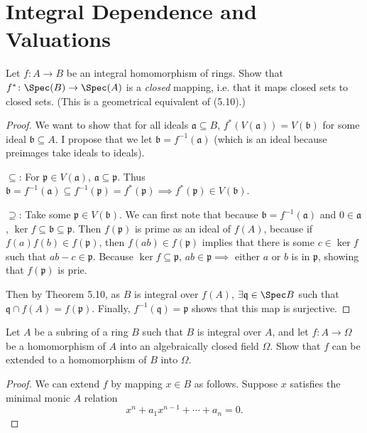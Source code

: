 \section{Integral Dependence and Valuations}

\begin{exercise}
	Let $f \colon A \to B$ be an integral homomorphism of rings. Show that $f^\ast\colon \Spec(B) \to \Spec(A)$ is a \textit{closed} mapping, i.e. that it maps closed sets to closed sets. (This is a geometrical equivalent of (5.10).)
\end{exercise}
\begin{proof}
	We want to show that for all ideals $\mathfrak{a} \subseteq B $, $f^\ast(V(\mathfrak{a})) = V(\mathfrak{b}) $ for some ideal $\mathfrak{b} \subseteq A $.
	I propose that we let $\mathfrak{b} = f^{-1}(\mathfrak{a}) $ (which is an ideal because preimages take ideals to ideals).
	
	$\subseteq  $: For $\mathfrak{p} \in V(\mathfrak{a}) $, $\mathfrak{a} \subseteq \mathfrak{p} $.
	Thus $\mathfrak{b} = f^{-1}(\mathfrak{a}) \subseteq f^{-1}(\mathfrak{p}) = f^\ast(\mathfrak{p}) \implies f^\ast(\mathfrak{p}) \in V(\mathfrak{b})$.

	$\supseteq  $: Take some $\mathfrak{p} \in V(\mathfrak{b}) $.
	We can first note that because $\mathfrak{b} = f^{-1}(\mathfrak{a}) $ and $0\in \mathfrak{a} $, $\ker f \subseteq \mathfrak{b} \subseteq \mathfrak{p} $.
	Then $f(\mathfrak{p}) $ is prime as an ideal of $f(A) $, because if $f(a)f(b) \in f(\mathfrak{p}) $, then $f(ab) \in f(\mathfrak{p})$ implies that there is some $c \in \ker f $ such that $ab - c \in \mathfrak{p} $.
	Because $\ker f \subseteq \mathfrak{p} $, $ab \in \mathfrak{p}\implies $ either $a $ or $b $ is in $\mathfrak{p} $, showing that $f(\mathfrak{p}) $ is prie.

	Then by Theorem 5.10, as $B $ is integral over $f(A) $, $\exists \mathfrak{q} \in \Spec B $ such that $\mathfrak{q}\cap f(A) = f(\mathfrak{p})$.
	Finally, $f^{-1}(\mathfrak{q}) = \mathfrak{p}$ shows that this map is surjective.
\end{proof}

\begin{exercise}
	Let $A$ be a subring of a ring $B$ such that $B$ is integral over $A$, and let $f \colon A \to \Omega$ be a homomorphism of $A$ into an algebraically closed field $\Omega$. Show that $f\!$ can be extended to a homomorphism of $B$ into $\Omega$.
\end{exercise}
\begin{proof}
	We can extend $f $ by mapping $x\in B $ as follows.
	Suppose $x $ satisfies the minimal monic $A $ relation
	\[
		x^n + a_{1} x^{n-1} + \cdots + a_n = 0 
	.\] 
\end{proof}

